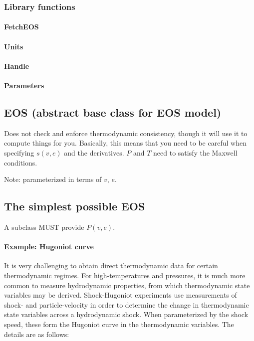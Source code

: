 \documentclass[twocolumn,10pt]{asme2ej}
\begin{document}
\subsubsection{Library functions}
\paragraph{FetchEOS}
\paragraph{Units}
\paragraph{Handle}
\paragraph{Parameters}

\subsection{EOS (abstract base class for EOS model)}
Does not check and enforce thermodynamic consistency, though it will use it to compute things for you. Basically, this means that you need to be careful when specifying $s\left(v,e\right)$ and the  derivatives. $P$ and $T$ need to satisfy the Maxwell conditions.

Note: parameterized in terms of $v$, $e$. 

\subsection{The simplest possible EOS}
A subclass MUST provide $P\left(v,e\right)$.

\paragraph{Example: Hugoniot curve}
It is very challenging to obtain direct thermodynamic data for certain thermodynamic regimes. For high-temperatures and pressures, it is much more common to measure hydrodynamic properties, from which thermodynamic state variables may be derived. Shock-Hugoniot experiments use measurements of shock- and particle-velocity in order to determine the change in thermodynamic state variables across a hydrodynamic shock. When parameterized by the shock speed, these form the Hugoniot curve in the thermodynamic variables. The details are as follows:
\end{document}
